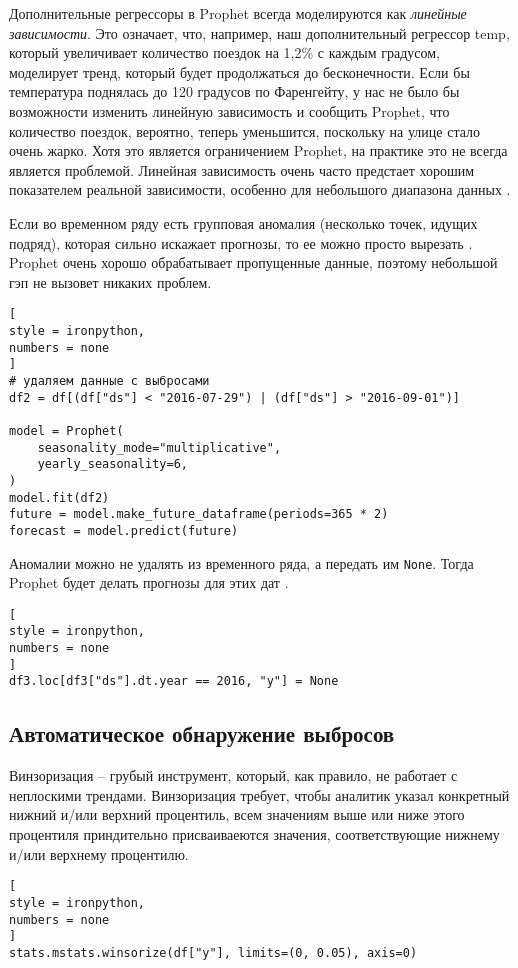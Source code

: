 \documentclass[%
	11pt,
	a4paper,
	utf8,
		]{article}
\begin{document}
Дополнительные регрессоры в Prophet всегда моделируются как \emph{линейные зависимости}. Это означает, что, например, наш дополнительный регрессор temp, который увеличивает количество поездок на 1,2\% с каждым градусом, моделирует тренд, который будет продолжаться до бесконечности. Если бы температура поднялась до 120 градусов по Фаренгейту, у нас не было бы возможности изменить линейную зависимость и сообщить Prophet, что количество поездок, вероятно, теперь уменьшится, поскольку на улице стало очень жарко. Хотя это является ограничением Prophet, на практике это не всегда является проблемой. Линейная зависимость очень часто предстает хорошим показателем реальной зависимости, особенно для небольшого диапазона данных \cite[]{gruzdev:time-series-2022}.

Если во временном ряду есть групповая аномалия (несколько точек, идущих подряд), которая сильно искажает прогнозы, то ее можно просто вырезать \cite[]{gruzdev:time-series-2022}. Prophet очень хорошо обрабатывает пропущенные данные, поэтому небольшой гэп не вызовет никаких проблем.
\begin{lstlisting}[
style = ironpython,
numbers = none
]
# удаляем данные с выбросами
df2 = df[(df["ds"] < "2016-07-29") | (df["ds"] > "2016-09-01")]

model = Prophet(
    seasonality_mode="multiplicative",
    yearly_seasonality=6,
)
model.fit(df2)
future = model.make_future_dataframe(periods=365 * 2)
forecast = model.predict(future)
\end{lstlisting}

Аномалии можно не удалять из временного ряда, а передать им \verb|None|. Тогда Prophet будет делать прогнозы для этих дат \cite[]{gruzdev:time-series-2022}.
\begin{lstlisting}[
style = ironpython,
numbers = none
]
df3.loc[df3["ds"].dt.year == 2016, "y"] = None
\end{lstlisting}

\subsection{Автоматическое обнаружение выбросов}

Винзоризация -- грубый инструмент, который, как правило, не работает с неплоскими трендами. Винзоризация требует, чтобы аналитик указал конкретный нижний и/или верхний процентиль, всем значениям выше или ниже этого процентиля приндительно присваиваеются значения, соответствующие нижнему и/или верхнему процентилю.
\begin{lstlisting}[
style = ironpython,
numbers = none
]
stats.mstats.winsorize(df["y"], limits=(0, 0.05), axis=0)
\end{lstlisting}
\end{document}
